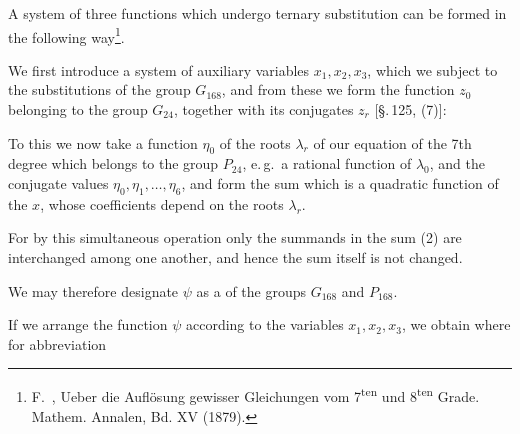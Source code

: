 
A system of three functions which undergo ternary substitution can be formed in the following way\footnote{F.\ , \glqq Ueber die Auflösung gewisser Gleichungen vom 7\textsuperscript{ten} und 8\textsuperscript{ten} Grade\grqq. Mathem. Annalen, Bd. XV (1879).}.

We first introduce a system of auxiliary variables $x_1, x_2, x_3$, which we subject to the substitutions of the group $G_{168}$, and from these we form the function $z_0$ belonging to the group $G_{24}$, together with its conjugates $z_r$ [\S.\,125, (7)]:

To this we now take a function $\eta_0$ of the roots $\lambda_r$ of our equation of the 7th degree which belongs to the group $P_{24}$, e.\,g.\ a rational function of $\lambda_0$, and the conjugate values $\eta_0, \eta_1, \ldots, \eta_6$, and form the sum
which is a quadratic function of the $x$, whose coefficients depend on the roots $\lambda_r$.

 For by this simultaneous operation only the summands in the sum (2) are interchanged among one another, and hence the sum itself is not changed.

We may therefore designate $\psi$ as a  of the groups $G_{168}$ and $P_{168}$.

If we arrange the function $\psi$ according to the variables $x_1, x_2, x_3$, we obtain
where for abbreviation
